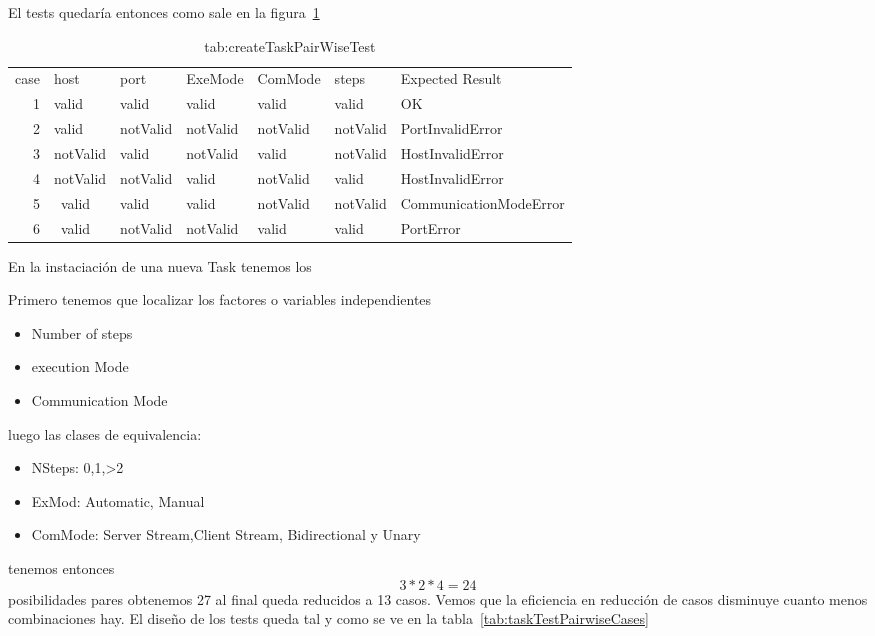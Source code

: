 El tests quedaría entonces como sale en la figura~\cref{tab:createTaskPairWiseTest}

\begin{table}[H]
    \small
    \begin{tabular}{rllllll}
        case & host     & port     & ExeMode  & ComMode  & steps    & Expected Result        \\
        1    & valid    & valid    & valid    & valid    & valid    & OK                     \\
        2    & valid    & notValid & notValid & notValid & notValid & PortInvalidError       \\
        3    & notValid & valid    & notValid & valid    & notValid & HostInvalidError       \\
        4    & notValid & notValid & valid    & notValid & valid    & HostInvalidError       \\
        5    & ~valid   & valid    & valid    & notValid & notValid & CommunicationModeError \\
        6    & ~valid   & notValid & notValid & valid    & valid    & PortError
    \end{tabular}
    \caption{tab:createTaskPairWiseTest}\label{tab:createTaskPairWiseTest}
\end{table}

En la instaciación de una nueva Task tenemos los

Primero tenemos que localizar los factores o variables independientes

\begin{itemize}
    \item Number of steps
    \item execution Mode
    \item Communication Mode
\end{itemize}

luego las clases de equivalencia:

\begin{itemize}
    \item NSteps: 0,1,>2
    \item ExMod: Automatic, Manual
    \item ComMode: Server Stream,Client Stream, Bidirectional y Unary
\end{itemize}

tenemos entonces \[ 3*2*4 = 24 \] posibilidades pares obtenemos 27 al final queda reducidos a 13 casos. Vemos que la eficiencia en reducción de casos disminuye cuanto menos combinaciones hay. El diseño de los tests queda tal y como se ve en la tabla~\cref{tab:taskTestPairwiseCases}

